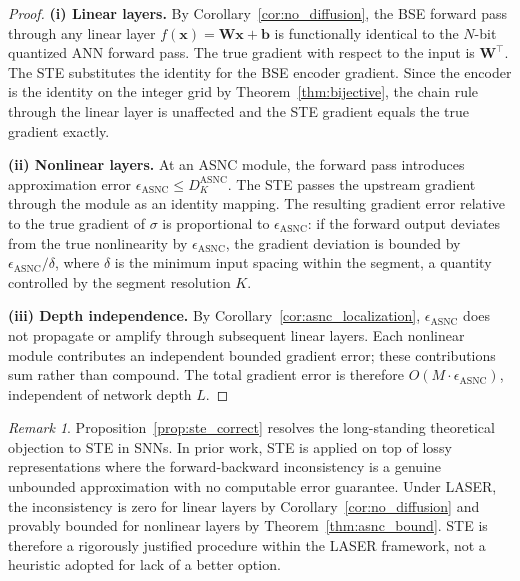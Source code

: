 \documentclass{article}
\theoremstyle{plain}
\theoremstyle{definition}
\theoremstyle{remark}
\newtheorem{remark}[theorem]{Remark}
\begin{document}
\begin{proof}
\textbf{(i) Linear layers.}
By Corollary~\ref{cor:no_diffusion}, the BSE forward pass through any linear layer
$f(\mathbf{x}) = \mathbf{W}\mathbf{x} + \mathbf{b}$ is functionally identical to
the $N$-bit quantized ANN forward pass. The true gradient with respect to the input
is $\mathbf{W}^\top$. The STE substitutes the identity for the BSE encoder gradient.
Since the encoder is the identity on the integer grid by
Theorem~\ref{thm:bijective}, the chain rule through the linear layer is unaffected
and the STE gradient equals the true gradient exactly.

\textbf{(ii) Nonlinear layers.}
At an ASNC module, the forward pass introduces approximation error
$\epsilon_{\mathrm{ASNC}} \le D_K^{\mathrm{ASNC}}$. The STE passes the upstream
gradient through the module as an identity mapping. The resulting gradient error
relative to the true gradient of $\sigma$ is proportional to
$\epsilon_{\mathrm{ASNC}}$: if the forward output deviates from the true nonlinearity
by $\epsilon_{\mathrm{ASNC}}$, the gradient deviation is bounded by
$\epsilon_{\mathrm{ASNC}} / \delta$, where $\delta$ is the minimum input spacing
within the segment, a quantity controlled by the segment resolution $K$.

\textbf{(iii) Depth independence.}
By Corollary~\ref{cor:asnc_localization}, $\epsilon_{\mathrm{ASNC}}$ does not
propagate or amplify through subsequent linear layers. Each nonlinear module
contributes an independent bounded gradient error; these contributions sum rather than
compound. The total gradient error is therefore $O(M \cdot \epsilon_{\mathrm{ASNC}})$,
independent of network depth $L$.
\end{proof}

\begin{remark}
Proposition~\ref{prop:ste_correct} resolves the long-standing theoretical objection
to STE in SNNs. In prior work, STE is applied on top of lossy representations where
the forward-backward inconsistency is a genuine unbounded approximation with no
computable error guarantee. Under LASER, the inconsistency is zero for linear layers
by Corollary~\ref{cor:no_diffusion} and provably bounded for nonlinear layers by
Theorem~\ref{thm:asnc_bound}. STE is therefore a rigorously justified procedure
within the LASER framework, not a heuristic adopted for lack of a better option.
\end{remark}


\end{document}
